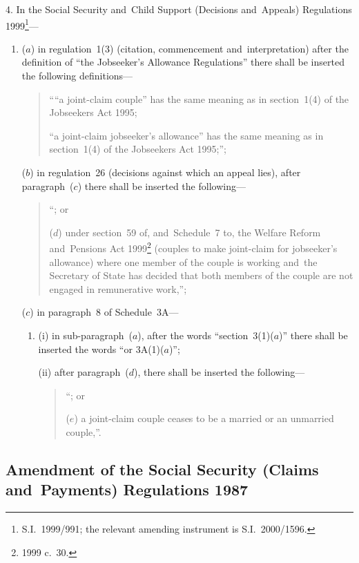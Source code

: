 \documentclass[12pt,a4paper]{article}
\begin{document}
4.  In the Social Security and~Child Support (Decisions and~Appeals) Regulations 1999\footnote{S.I.~1999/991; the relevant amending instrument is S.I.~2000/1596.}—
\begin{enumerate}\item[]
($a$) in regulation~1(3) (citation, commencement and~interpretation) after the definition of “the Jobseeker’s Allowance Regulations” there shall be inserted the following definitions—
\begin{quotation}
    ““a joint-claim couple” has the same meaning as in section~1(4) of the Jobseekers Act 1995;

    “a joint-claim jobseeker’s allowance” has the same meaning as in section~1(4) of the Jobseekers Act 1995;”; 
\end{quotation}

($b$) in regulation~26 (decisions against which an appeal lies), after paragraph~($c$)  there shall be inserted the following—
\begin{quotation}
    “; or

    ($d$) 
    under section~59 of, and~Schedule~7 to, the Welfare Reform and~Pensions Act 1999\footnote{1999 c.~30.} (couples to make joint-claim for jobseeker’s allowance) where one member of the couple is working and~the Secretary of State has decided that both members of the couple are not engaged in remunerative work,”; 
\end{quotation}

($c$) in paragraph~8 of Schedule~3A—
\begin{enumerate}\item[]
(i) in sub-paragraph~($a$), after the words “section~3(1)($a$)” there shall be inserted the words “or 3A(1)($a$)”;

(ii) after paragraph~($d$), there shall be inserted the following—
\begin{quotation}
    “; or

    ($e$) 
    a joint-claim couple ceases to be a married or an unmarried couple,”. 
\end{quotation}
\end{enumerate}
\end{enumerate}

\subsection[5. Amendment of the Social Security (Claims and~Payments) Regulations 1987]{Amendment of the Social Security (Claims and~Payments) Regulations 1987}
\end{document}

